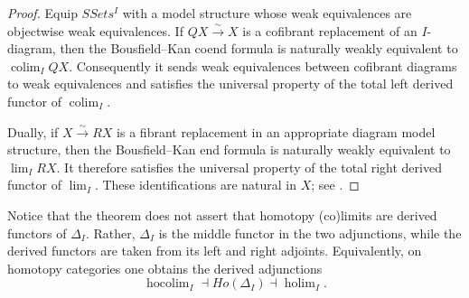 \documentclass[11pt,a4paper]{article}
\begin{document}
\begin{proof}
Equip $SSets^I$ with a model structure whose weak equivalences are
objectwise weak equivalences.  If $QX\xrightarrow{\sim}X$ is a cofibrant
replacement of an $I$-diagram, then the Bousfield--Kan coend formula is
naturally weakly equivalent to $\operatorname{colim}_I QX$.  Consequently
it sends weak equivalences between cofibrant diagrams to weak
equivalences and satisfies the universal property of the total left
derived functor of $\operatorname{colim}_I$.

Dually, if $X\xrightarrow{\sim}RX$ is a fibrant replacement in an
appropriate diagram model structure, then the Bousfield--Kan end formula
is naturally weakly equivalent to $\operatorname{lim}_I RX$.  It therefore
satisfies the universal property of the total right derived functor of
$\operatorname{lim}_I$.  These identifications are natural in $X$; see
\cite[Theorems~19.9.1 and~19.9.2]{Hir}.
\end{proof}

Notice that the theorem does not assert that homotopy (co)limits are
derived functors of $\Delta_I$.  Rather, $\Delta_I$ is the middle functor
in the two adjunctions, while the derived functors are taken from its left
and right adjoints.  Equivalently, on homotopy categories one obtains the
derived adjunctions
\[
 \operatorname{hocolim}_I\dashv Ho(\Delta_I)
 \dashv \operatorname{holim}_I.
\]





\end{document}
